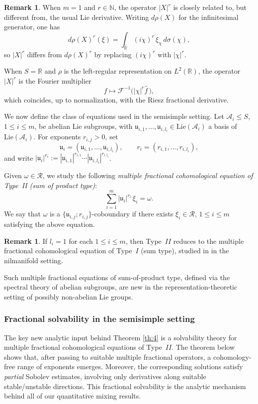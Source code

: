 \documentclass[11 pt]{amsart}
\newcommand{\NN}{\mathbb{N}}
\newcommand{\RR}{\mathbb{R}}
\theoremstyle{definition}
\newtheorem{remark}[theorem]{Remark}
\numberwithin{equation}{section}
\def\Lie{\mathrm{Lie}}
\begin{document}
\begin{remark} When $m=1$ and \(r\in\NN\), the operator $|X|^r$ is closely related to, but different from, the usual Lie derivative. Writing $d\rho(X)$ for the infinitesimal generator, one has
\[
d\rho(X)^r(\xi)
=
\int_{\widehat{\RR}} (i\chi)^r\,\xi_\chi\,d\sigma(\chi),
\]
so $|X|^r$ differs from $d\rho(X)^r$ by replacing $(i\chi)^r$ with $|\chi|^r$.



 When $S=\RR$ and $\rho$ is the left-regular representation on $L^2(\RR)$, the operator $|X|^r$ is the Fourier multiplier
\[
f\longmapsto \mathcal F^{-1}\bigl(|\chi|^r\widehat f\,\bigr),
\]
which coincides, up to normalization, with the Riesz fractional derivative.
\end{remark}
We now define the class of equations used in the semisimple setting. Let $\mathcal A_i\le S$, $1\le i\le m$,
be abelian Lie subgroups, with $\mathfrak u_{i,1},\dots,\mathfrak u_{i,l_i}\in\Lie(\mathcal A_i)$ a basis of \(\Lie(\mathcal A_i)\). For exponents \(r_{i,j}>0\), set
\[
\mathfrak u_i=(\mathfrak u_{i,1},\dots,\mathfrak u_{i,l_i}),
\qquad
r_i=(r_{i,1},\dots,r_{i,l_i}),
\]
and write $|\mathfrak u_i|^{r_i}:=
|\mathfrak u_{i,1}|^{r_{i,1}}\cdots |\mathfrak u_{i,l_i}|^{r_{i,l_i}}$.

Given \(\omega\in\mathcal R\), we study the following \emph{multiple fractional cohomological equation of Type~II (sum of product type)}:
\[
\sum_{i=1}^m |\mathfrak u_{i}|^{r_{i}}\,\xi_{i}=\omega.
\]
We say that \(\omega\) is a \(\{\mathfrak u_{i,j};r_{i,j}\}\)-coboundary if there exists \(\xi_i\in\mathcal R\), $1\le i\le m$ satisfying the above equation.

\begin{remark} If $l_i=1$ for each $1\leq i\leq m$, then Type~$II$ reduces to the multiple fractional cohomological equation of Type~$I$ (sum type), studied in \cite{W2} in the nilmanifold setting.

\end{remark}
Such multiple fractional equations of sum-of-product type, defined via the spectral theory of abelian subgroups, are new in the representation-theoretic setting of possibly non-abelian Lie groups.









\subsubsection{Fractional solvability in the semisimple setting}
The key new analytic input behind Theorem \ref{th:4} is a solvability theory for multiple fractional cohomological equations of Type~$II$.
The theorem below shows that, after passing to suitable multiple fractional operators, a cohomology-free range of exponents emerges.
Moreover, the corresponding solutions satisfy \emph{partial} Sobolev estimates, involving only derivatives along suitable stable/unstable directions. This fractional solvability is the analytic mechanism behind all of our quantitative mixing results.
\end{document}
